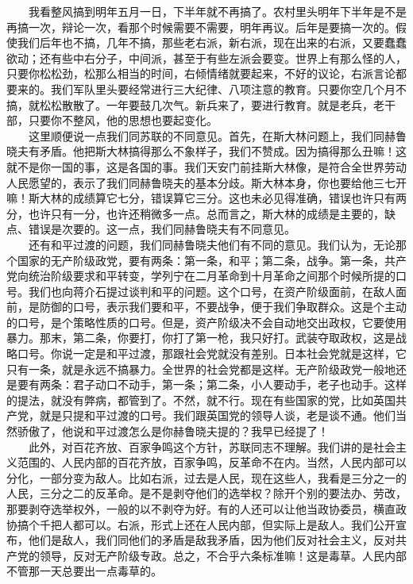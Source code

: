 \documentclass[cn,11pt,chinese]{elegantbook}
\begin{document}
　　我看整风搞到明年五月一日，下半年就不再搞了。农村里头明年下半年是不是再搞一次，辩论一次，看那个时候需要不需要，明年再议。后年是要搞一次的。假使我们后年也不搞，几年不搞，那些老右派，新右派，现在出来的右派，又要蠢蠢欲动；还有些中右分子，中间派，甚至于有些左派会要变。世界上有那么怪的人，只要你松松劲，松那么相当的时间，右倾情绪就要起来，不好的议论，右派言论都要来的。我们军队里头要经常进行三大纪律、八项注意的教育。只要你空几个月不搞，就松松散散了。一年要鼓几次气。新兵来了，要进行教育。就是老兵，老干部，只要你不整风，他的思想也要起变化。\\
　　这里顺便说一点我们同苏联的不同意见。首先，在斯大林问题上，我们同赫鲁晓夫有矛盾。他把斯大林搞得那么不象样子，我们不赞成。因为搞得那么丑嘛！这就不是你一国的事，这是各国的事。我们天安门前挂斯大林像，是符合全世界劳动人民愿望的，表示了我们同赫鲁晓夫的基本分歧。斯大林本身，你也要给他三七开嘛！斯大林的成绩算它七分，错误算它三分。这也未必见得准确，错误也许只有两分，也许只有一分，也许还稍微多一点。总而言之，斯大林的成绩是主要的，缺点、错误是次要的。这一点，我们同赫鲁晓夫有不同意见。\\
　　还有和平过渡的问题，我们同赫鲁晓夫他们有不同的意见。我们认为，无论那个国家的无产阶级政党，要有两条：第一条，和平；第二条，战争。第一条，共产党向统治阶级要求和平转变，学列宁在二月革命到十月革命之间那个时候所提的口号。我们也向蒋介石提过谈判和平的问题。这个口号，在资产阶级面前，在敌人面前，是防御的口号，表示我们要和平，不要战争，便于我们争取群众。这是个主动的口号，是个策略性质的口号。但是，资产阶级决不会自动地交出政权，它要使用暴力。那末，第二条，你要打，你打了第一枪，我只好打。武装夺取政权，这是战略口号。你说一定是和平过渡，那跟社会党就没有差别。日本社会党就是这样，它只有一条，就是永远不搞暴力。全世界的社会党都是这样。无产阶级政党一般地还是要有两条：君子动口不动手，第一条；第二条，小人要动手，老子也动手。这样的提法，就没有弊病，都管到了。不然，就不行。现在有些国家的党，比如英国共产党，就是只提和平过渡的口号。我们跟英国党的领导人谈，老是谈不通。他们当然骄傲了，他说和平过渡怎么是你赫鲁晓夫提的？我早已经提了！\\
　　此外，对百花齐放、百家争鸣这个方针，苏联同志不理解。我们讲的是社会主义范围的、人民内部的百花齐放，百家争鸣，反革命不在内。当然，人民内部可以分化，一部分变为敌人。比如右派，过去是人民，现在这些人，我看是三分之一的人民，三分之二的反革命。是不是剥夺他们的选举权？除开个别的要法办、劳改，那要剥夺选举权外，一般的以不剥夺为好。有的人还可以让他当政协委员，横直政协搞个千把人都可以。右派，形式上还在人民内部，但实际上是敌人。我们公开宣布，他们是敌人，我们同他们的矛盾是敌我矛盾，因为他们反对社会主义，反对共产党的领导，反对无产阶级专政。总之，不合乎六条标准嘛！这是毒草。人民内部不管那一天总要出一点毒草的。\\
\end{document}
